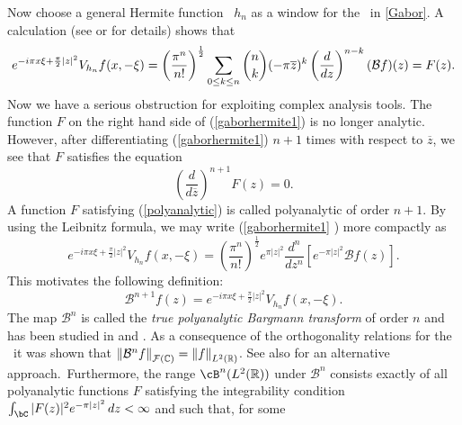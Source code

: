 \documentclass[12pt]{amsart}
\theoremstyle{plain}
\numberwithin{equation}{section}
\begin{document}
Now choose a general Hermite function \ $h_{n}$ as a window for the \stft\
in \eqref{Gabor}. A calculation (see \cite{BS93} or \cite{CharlyYura} for
details) shows that%
\begin{equation}
e^{-i\pi x\xi +\frac{\pi }{2}\left\vert z\right\vert ^{2}}V_{h_{n}}f(x,-\xi
)=\left( \frac{\pi ^{n}}{n!}\right) ^{\frac{1}{2}}\sum_{0\leq k\leq n}\binom{%
n}{k}(-\pi \overline{z})^{k}\left( \frac{d}{dz}\right) ^{n-k}(\mathcal{B}%
f)(z)=F(z)\text{.}  \label{gaborhermite1}
\end{equation}%
Now we have a serious obstruction for exploiting complex analysis tools. The
function $F$ on the right hand side of (\ref{gaborhermite1}) is no longer
analytic. However, after differentiating (\ref{gaborhermite1}) $n+1$ times
with respect to $\overline{z}$, we see that $F$ satisfies the equation%
\begin{equation}
\left( \frac{d}{d\overline{z}}\right) ^{n+1}F(z)=0\text{.}
\label{polyanalytic}
\end{equation}%
A function $F$ satisfying (\ref{polyanalytic}) is called polyanalytic of
order $n+1$. By using the Leibnitz formula, we may write (\ref{gaborhermite1}%
) more compactly as 
\begin{equation}
e^{-i\pi x\xi +\frac{\pi }{2}\left\vert z\right\vert ^{2}}V_{h_{n}}f(x,-\xi
)=\left( \frac{\pi ^{n}}{n!}\right) ^{\frac{1}{2}}e^{\pi \left\vert
z\right\vert ^{2}}\frac{d^{n}}{dz^{n}}\left[ e^{-\pi \left\vert z\right\vert
^{2}}\mathcal{B}f(z)\right] \text{.}  \label{eq:hmhm}
\end{equation}%
This motivates the following definition:%
\begin{equation}
\mathcal{B}^{n+1}f(z)=e^{-i\pi x\xi +\frac{\pi }{2}\left\vert z\right\vert
^{2}}V_{h_{n}}f(x,-\xi ).  \label{polyBargmann}
\end{equation}%
The map $\mathcal{B}^{n}$ is called the \emph{true polyanalytic Bargmann
transform} of order $n$ and has been studied in \cite{Abreusampling} and 
\cite{Abreustructure}. As a consequence of the orthogonality relations for
the \stft\ it was shown that $\left\Vert \mathcal{B}^{n}f\right\Vert _{%
\mathcal{F}(%
\mathbb{C}
)}=\left\Vert f\right\Vert _{L^{2}(%
\mathbb{R}
)}$. See also \cite{Hunik} for an alternative approach.\ Furthermore, the
range $\cB^{n}(L^{2}(\mathbb{R}))$ under $\mathcal{B}^{n}$ consists exactly
of all polyanalytic functions $F$ satisfying the integrability condition $%
\int_{\bC}|F(z)|^{2}e^{-\pi |z|^{2}}\,dz<\infty $ and such that, for some
\end{document}
